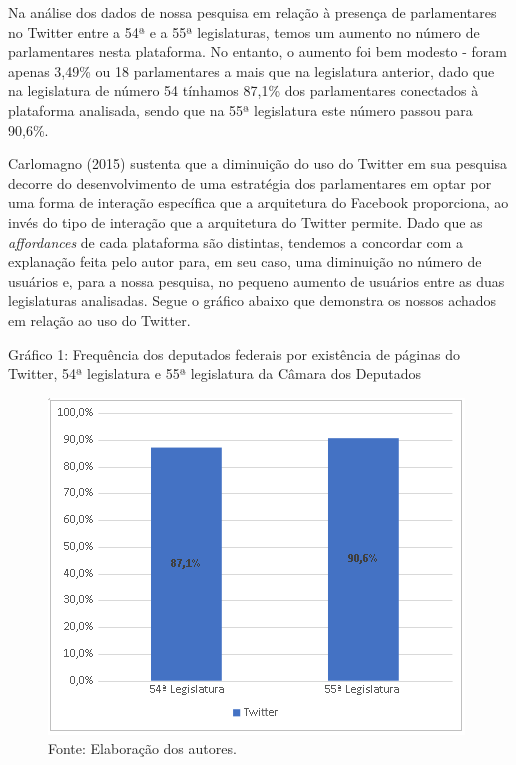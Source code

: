 Na análise dos dados de nossa pesquisa em relação à presença de
parlamentares no Twitter entre a 54ª e a 55ª legislaturas, temos um
aumento no número de parlamentares nesta plataforma. No entanto, o
aumento foi bem modesto - foram apenas 3,49\% ou 18 parlamentares a mais
que na legislatura anterior, dado que na legislatura de número 54
tínhamos 87,1\% dos parlamentares conectados à plataforma analisada,
sendo que na 55ª legislatura este número passou para 90,6\%.

Carlomagno (2015) sustenta que a diminuição do uso do Twitter em sua
pesquisa decorre do desenvolvimento de uma estratégia dos parlamentares
em optar por uma forma de interação específica que a arquitetura do
Facebook proporciona, ao invés do tipo de interação que a arquitetura do
Twitter permite. Dado que as \emph{affordances} de cada plataforma são
distintas, tendemos a concordar com a explanação feita pelo autor para,
em seu caso, uma diminuição no número de usuários e, para a nossa
pesquisa, no pequeno aumento de usuários entre as duas legislaturas
analisadas. Segue o gráfico abaixo que demonstra os nossos achados em
relação ao uso do Twitter.

\pagebreak

\begin{center}
Gráfico 1: Frequência dos deputados federais por existência de páginas
do Twitter, 54ª legislatura e 55ª legislatura da Câmara dos Deputados

\begin{figure}[!ht]
\centering
 \includegraphics[width=\textwidth]{./imgs/graf2_1.png}
\caption{Fonte: Elaboração dos autores.}
\end{figure}
\end{center}

